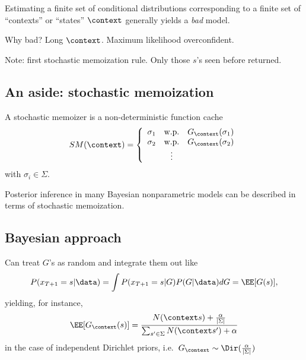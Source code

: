 \documentclass[16pt]{beamer}
\begin{document}
\begin{frame}[t]{}
\begin{frame}[t]{}
Estimating a finite set of conditional distributions corresponding to a finite set of ``contexts'' or ``states'' $\context$ generally yields a {\em bad} model.

\vspace{.5cm}
Why bad?  Long $\context$.  Maximum likelihood overconfident.

\vspace{.5cm}
Note: first stochastic memoization rule.  Only those $s$'s seen before returned.

\end{frame}	

\subsection{An aside: stochastic memoization}
\begin{frame}[t]{}
A stochastic memoizer \cite{Goodman2008} is a non-deterministic function cache 
\begin{align*}
SM(\context) = \left\{\begin{array}{ccc}
\sigma_1  & \mbox{w.p.}  &  G_\context(\sigma_1) \\
\sigma_2  & \mbox{w.p.}  &  G_\context(\sigma_2)  \\
  &  \vdots &   
\end{array}\right.
\end{align*}
with $\sigma_i \in \Sigma$.
\vspace{.5cm}

Posterior inference in many Bayesian nonparametric models can be described in terms of stochastic memoization. 
\end{frame}

\subsection{Bayesian approach}
\begin{frame}[t]{}
Can treat $G$'s as random and integrate them out like
\begin{align*}
P(x_{T+1}=s|\data) = \int P(x_{T+1}=s|G)P(G|\data)dG = {\EE[G(s)] } ,
\end{align*}
yielding, for instance,
\begin{align*}
\EE[G_\context(s)]=\frac{N(\context s) + \frac{\alpha}{|\Sigma|}}{\sum_{s'\in\Sigma}N(\context s') + \alpha}
\end{align*}
in the case of independent Dirichlet priors, i.e.~$G_\context \sim \Dir(\frac{\alpha}{|\Sigma|})$


\end{frame}
\end{frame}
\end{document}
